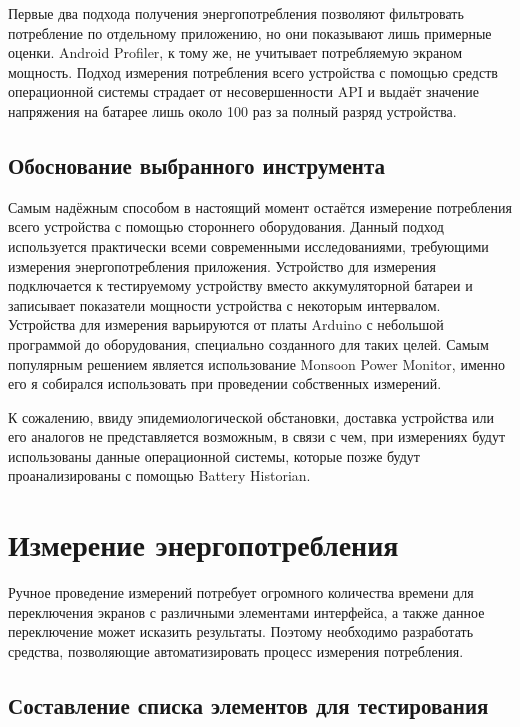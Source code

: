 \documentclass[a4paper,14pt]{extarticle} %
\begin{document}
	Первые два подхода получения энергопотребления позволяют фильтровать потребление по отдельному приложению, но они показывают лишь примерные оценки. Android Profiler, к тому же, не учитывает потребляемую экраном мощность. Подход измерения потребления всего устройства с помощью средств операционной системы страдает от несовершенности API и выдаёт значение напряжения на батарее лишь около 100 раз за полный разряд устройства.
	
	\subsection{Обоснование выбранного инструмента}
	
	Самым надёжным способом в настоящий момент остаётся измерение потребления всего устройства с помощью стороннего оборудования. Данный подход используется практически всеми современными исследованиями, требующими измерения энергопотребления приложения. Устройство для измерения подключается к тестируемому устройству вместо аккумуляторной батареи и записывает показатели мощности устройства с некоторым интервалом. Устройства для измерения варьируются от платы Arduino с небольшой программой до оборудования, специально созданного для таких целей. Самым популярным решением является использование Monsoon Power Monitor, именно его я собирался использовать при проведении собственных измерений. 
	
	К сожалению, ввиду эпидемиологической обстановки, доставка устройства или его аналогов не представляется возможным, в связи с чем, при измерениях будут использованы данные операционной системы, которые позже будут проанализированы с помощью Battery Historian.
	
	\newpage
	\section{Измерение энергопотребления}
	
	Ручное проведение измерений потребует огромного количества времени для переключения экранов с различными элементами интерфейса, а также данное переключение может исказить результаты. Поэтому необходимо разработать средства, позволяющие автоматизировать процесс измерения потребления.
	
	\subsection{Составление списка элементов для тестирования}
	
\end{document}
